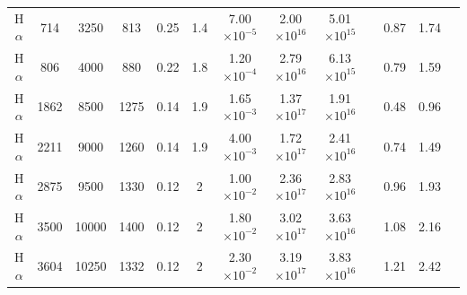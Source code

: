 \documentclass[useAMS,usenatbib,usegraphicx]{mnras}
\begin{document}
\begin{table}
\begin{minipage}{180mm}
\begin{center}
\begin{tabular}{@{} ccccccccccccc @{}}
H$\alpha$ & 714 & 3250 & 813&0.25 & 1.4 & 7.00$\times 10^{-5}$ &   2.00$\times 10^{16}$ & 5.01$\times 10^{15}$ & & 0.87 & 1.74 \\
H$\alpha$ & 806 & 4000 & 880&0.22 & 1.8 & 1.20$\times 10^{-4}$ &   2.79$\times 10^{16}$ & 6.13$\times 10^{15}$ & & 0.79 & 1.59\\
H$\alpha$ & 1862 & 8500 & 1275&0.14 & 1.9 & 1.65$\times 10^{-3}$ &   1.37$\times 10^{17}$ & 1.91$\times 10^{16}$ & & 0.48 & 0.96 \\

H$\alpha$ & 2211 & 9000 & 1260&0.14 & 1.9 & 4.00$\times 10^{-3}$ &   1.72$\times 10^{17}$ & 2.41$\times 10^{16}$ & & 0.74 & 1.49\\

H$\alpha$ & 2875 & 9500 & 1330&0.12 & 2 & 1.00$\times 10^{-2}$ &   2.36$\times 10^{17}$ & 2.83$\times 10^{16}$ & & 0.96 & 1.93 \\

H$\alpha$ & 3500 & 10000 & 1400&0.12 & 2 & 1.80$\times 10^{-2}$  & 3.02$\times 10^{17}$ & 3.63$\times 10^{16}$ && 1.08 & 2.16  \\

H$\alpha$ & 3604 & 10250 & 1332&0.12 & 2 & 2.30$\times 10^{-2}$ &   3.19$\times 10^{17}$ & 3.83$\times 10^{16}$ & & 1.21 & 2.42 \\ 

    \hline
  \end{tabular}
  \end{center}
\end{minipage}
\end{table}
\end{document}
